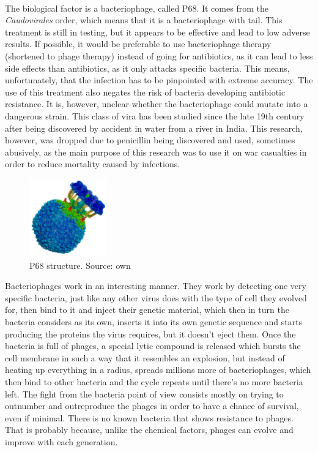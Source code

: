 \paragraph{}The biological factor is a bacteriophage, called P68. It comes from the \emph{Caudovirales} order, which means that it is a bacteriophage with tail.  This treatment is still in testing, but it appears to be effective and lead to low adverse results. If possible, it would be preferable to use bacteriophage therapy (shortened to phage therapy) instead of going for antibiotics, as it can lead to less side effects than antibiotics, as it only attacks specific bacteria. This means, unfortunately, that the infection has to be pinpointed with extreme accuracy. The use of this treatment also negates the risk of bacteria developing antibiotic resistance. It is, however, unclear whether the bacteriophage could mutate into a dangerous strain. This class of vira has been studied since the late 19th century after being discovered by accident in water from a river in India. This research, however, was dropped due to penicillin being discovered and used, sometimes abusively, as the main purpose of this research was to use it on war casualties in order to reduce mortality caused by infections.
\newpage{}\begin{figure}\begin{center}\includegraphics[width=0.30\textwidth]{assets/staph_side.png}\end{center}\caption{P68 structure. Source: own}\end{figure}Bacteriophages work in an interesting manner. They work by detecting one very specific bacteria, just like any other virus does with the type of cell they evolved for, then bind to it and inject their genetic material, which then in turn the bacteria considers as its own, inserts it into its own genetic sequence and starts producing the proteins the virus requires, but it doesn't eject them. Once the bacteria is full of phages, a special lytic compound is released which bursts the cell membrane in such a way that it resembles an explosion, but instead of heating up everything in a radius, spreads millions more of bacteriophages, which then bind to other bacteria and the cycle repeats until there's no more bacteria left. The fight from the bacteria point of view consists mostly on trying to outnumber and outreproduce the phages in order to have a chance of survival, even if minimal. There is no known bacteria that shows resistance to phages. That is probably because, unlike the chemical factors, phages can evolve and improve with each generation.
